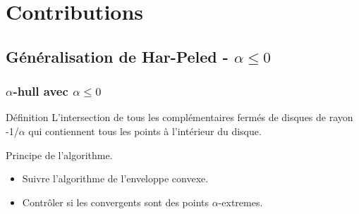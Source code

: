 \section{Contributions}

\subsection{Généralisation de Har-Peled - $\alpha \leq 0$}

\begin{frame}
  \frametitle{$\alpha$-hull avec $\alpha \leq 0$}
  \begin{block}{Définition}
		L'intersection de tous les complémentaires fermés de disques de rayon -1/$\alpha$ qui contiennent tous les points à l’intérieur du disque.
	\end{block} 

  \begin{block}{Principe de l'algorithme.}
		\begin{itemize}
				\item Suivre l'algorithme de l'enveloppe convexe.
				\item Contrôler si les convergents sont des points $\alpha$-extremes.
		\end{itemize}	
	\end{block} 

\end{frame}



